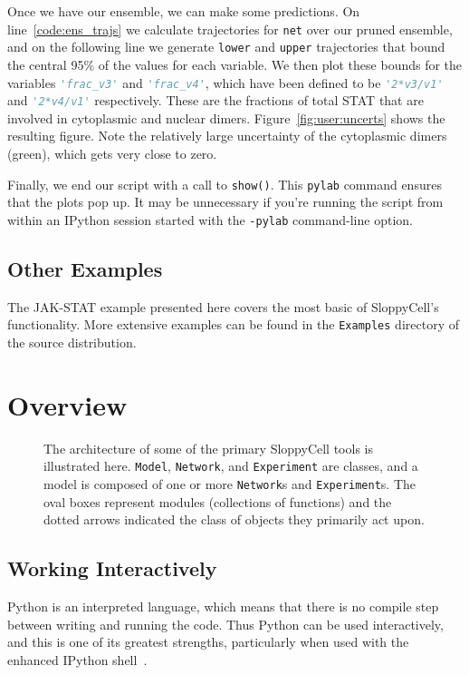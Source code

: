 \documentclass[12pt]{article}
\makeatletter
\newcommand{\py}[1]{\lstinline[language=Python, showstringspaces=False]@#1@}
\newcommand{\shell}[1]{\lstinline[language=csh, showstringspaces=False]!#1!}
\makeatother
\begin{document}
Once we have our ensemble, we can make some predictions.
On line~\ref{code:ens_trajs} we calculate trajectories for \py{net} over our pruned ensemble, and on the following line we generate \py{lower} and \py{upper} trajectories that bound the central 95\% of the values for each variable.
We then plot these bounds for the variables \py{'frac_v3'} and \py{'frac_v4'}, which have been defined to be \py{'2*v3/v1'} and \py{'2*v4/v1'} respectively. These are the fractions of total STAT that are involved in cytoplasmic and nuclear dimers.
Figure~\ref{fig:user:uncerts} shows the resulting figure.
Note the relatively large uncertainty of the cytoplasmic dimers (green), which gets very close to zero.

Finally, we end our script with a call to \py{show()}. This \py{pylab} command ensures that the plots pop up. It may be unnecessary if you're running the script from within an IPython session started with the \shell{-pylab} command-line option.

\subsection{Other Examples}

The JAK-STAT example presented here covers the most basic of SloppyCell's functionality.
More extensive examples can be found in the \shell{Examples} directory of the source distribution.

\section{Overview}

\begin{figure}
\begin{center}
%
\end{center}
\caption{The architecture of some of the primary SloppyCell tools is illustrated here. \py{Model}, \py{Network}, and \py{Experiment} are classes, and a model is composed of one or more \py{Network}s and \py{Experiment}s. The oval boxes represent modules (collections of functions) and the dotted arrows indicated the class of objects they primarily act upon.}
\end{figure}

\subsection{Working Interactively}
Python is an interpreted language, which means that there is no compile step between writing and running the code.
Thus Python can be used interactively, and this is one of its greatest strengths, particularly when used with the enhanced IPython shell~\cite{bib:Perez2007}.
\end{document}

